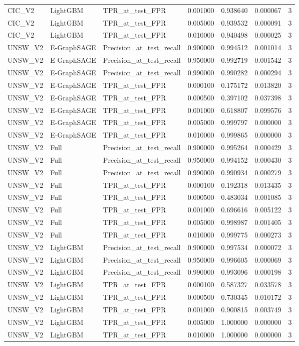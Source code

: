\begin{tabular}{lllrrrr}
CIC_V2 & LightGBM & TPR_at_test_FPR & 0.001000 & 0.938640 & 0.000067 & 3 \\
CIC_V2 & LightGBM & TPR_at_test_FPR & 0.005000 & 0.939532 & 0.000091 & 3 \\
CIC_V2 & LightGBM & TPR_at_test_FPR & 0.010000 & 0.940498 & 0.000025 & 3 \\
UNSW_V2 & E-GraphSAGE & Precision_at_test_recall & 0.900000 & 0.994512 & 0.001014 & 3 \\
UNSW_V2 & E-GraphSAGE & Precision_at_test_recall & 0.950000 & 0.992719 & 0.001542 & 3 \\
UNSW_V2 & E-GraphSAGE & Precision_at_test_recall & 0.990000 & 0.990282 & 0.000294 & 3 \\
UNSW_V2 & E-GraphSAGE & TPR_at_test_FPR & 0.000100 & 0.175172 & 0.013820 & 3 \\
UNSW_V2 & E-GraphSAGE & TPR_at_test_FPR & 0.000500 & 0.397102 & 0.037398 & 3 \\
UNSW_V2 & E-GraphSAGE & TPR_at_test_FPR & 0.001000 & 0.618807 & 0.099576 & 3 \\
UNSW_V2 & E-GraphSAGE & TPR_at_test_FPR & 0.005000 & 0.999797 & 0.000000 & 3 \\
UNSW_V2 & E-GraphSAGE & TPR_at_test_FPR & 0.010000 & 0.999865 & 0.000000 & 3 \\
UNSW_V2 & Full & Precision_at_test_recall & 0.900000 & 0.995264 & 0.000429 & 3 \\
UNSW_V2 & Full & Precision_at_test_recall & 0.950000 & 0.994152 & 0.000430 & 3 \\
UNSW_V2 & Full & Precision_at_test_recall & 0.990000 & 0.990934 & 0.000279 & 3 \\
UNSW_V2 & Full & TPR_at_test_FPR & 0.000100 & 0.192318 & 0.013435 & 3 \\
UNSW_V2 & Full & TPR_at_test_FPR & 0.000500 & 0.483034 & 0.001085 & 3 \\
UNSW_V2 & Full & TPR_at_test_FPR & 0.001000 & 0.696616 & 0.005122 & 3 \\
UNSW_V2 & Full & TPR_at_test_FPR & 0.005000 & 0.998987 & 0.001405 & 3 \\
UNSW_V2 & Full & TPR_at_test_FPR & 0.010000 & 0.999775 & 0.000273 & 3 \\
UNSW_V2 & LightGBM & Precision_at_test_recall & 0.900000 & 0.997534 & 0.000072 & 3 \\
UNSW_V2 & LightGBM & Precision_at_test_recall & 0.950000 & 0.996605 & 0.000069 & 3 \\
UNSW_V2 & LightGBM & Precision_at_test_recall & 0.990000 & 0.993096 & 0.000198 & 3 \\
UNSW_V2 & LightGBM & TPR_at_test_FPR & 0.000100 & 0.587327 & 0.033578 & 3 \\
UNSW_V2 & LightGBM & TPR_at_test_FPR & 0.000500 & 0.730345 & 0.010172 & 3 \\
UNSW_V2 & LightGBM & TPR_at_test_FPR & 0.001000 & 0.900815 & 0.003749 & 3 \\
UNSW_V2 & LightGBM & TPR_at_test_FPR & 0.005000 & 1.000000 & 0.000000 & 3 \\
UNSW_V2 & LightGBM & TPR_at_test_FPR & 0.010000 & 1.000000 & 0.000000 & 3 \\
\bottomrule
\end{tabular}
